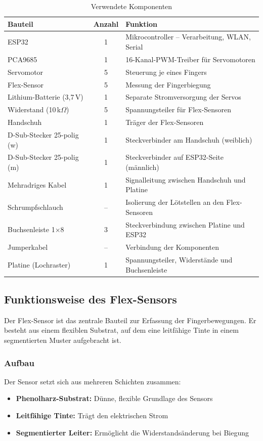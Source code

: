 \documentclass[12pt,a4paper]{article}
\begin{document}
\begin{table}[h]
\centering
\begin{tabular}{|l|c|l|}
\hline
\textbf{Bauteil} & \textbf{Anzahl} & \textbf{Funktion} \\
\hline
ESP32  & 1 & Mikrocontroller -- Verarbeitung, WLAN, Serial \\
PCA9685 & 1 & 16-Kanal-PWM-Treiber für Servomotoren \\
Servomotor & 5 & Steuerung je eines Fingers \\
Flex-Sensor & 5 & Messung der Fingerbiegung \\
Lithium-Batterie (3{,}7\,V) & 1 & Separate Stromversorgung der Servos \\
Widerstand (10\,k$\Omega$) & 5 & Spannungsteiler für Flex-Sensoren \\
Handschuh & 1 & Träger der Flex-Sensoren \\
D-Sub-Stecker 25-polig (w) & 1 & Steckverbinder am Handschuh (weiblich) \\
D-Sub-Stecker 25-polig (m) & 1 & Steckverbinder auf ESP32-Seite (männlich) \\
Mehradriges Kabel & 1 & Signalleitung zwischen Handschuh und Platine \\
Schrumpfschlauch & -- & Isolierung der Lötstellen an den Flex-Sensoren \\
Buchsenleiste 1$\times$8 & 3 & Steckverbindung zwischen Platine und ESP32 \\
Jumperkabel & -- & Verbindung der Komponenten \\
Platine (Lochraster) & 1 & Spannungsteiler, Widerstände und Buchsenleiste \\
\hline
\end{tabular}
\caption{Verwendete Komponenten}
\end{table}

\subsection{Funktionsweise des Flex-Sensors}

Der Flex-Sensor ist das zentrale Bauteil zur Erfassung der Fingerbewegungen. Er besteht aus einem flexiblen Substrat, auf dem eine leitfähige Tinte in einem segmentierten Muster aufgebracht ist.

\subsubsection{Aufbau}
Der Sensor setzt sich aus mehreren Schichten zusammen:
\begin{itemize}[itemsep=2pt]
    \item \textbf{Phenolharz-Substrat:} Dünne, flexible Grundlage des Sensors
    \item \textbf{Leitfähige Tinte:} Trägt den elektrischen Strom
    \item \textbf{Segmentierter Leiter:} Ermöglicht die Widerstandsänderung bei Biegung
\end{itemize}
\end{document}

